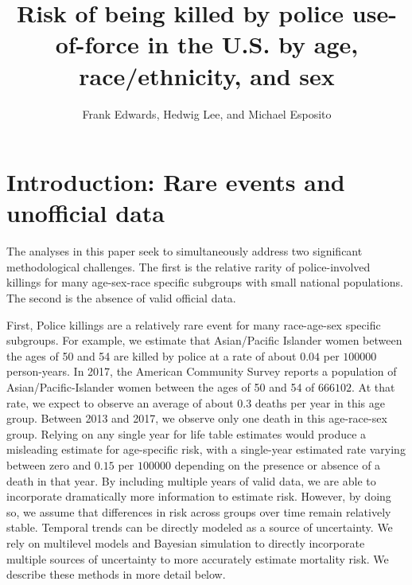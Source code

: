 \documentclass[9pt,twoside,lineno]{pnas-new}
\title{Risk of being killed by police use-of-force in the U.S. by age, race/ethnicity, and sex}
\author{Frank Edwards, Hedwig Lee, and Michael Esposito}
\begin{document}
\maketitle

\SItext

\section*{Introduction: Rare events and unofficial data}

The analyses in this paper seek to simultaneously address two significant methodological challenges. The first is the relative rarity of police-involved killings for many age-sex-race specific subgroups with small national populations. The second is the absence of valid official data. 

First, Police killings are a relatively rare event for many race-age-sex specific subgroups. For example, we estimate that Asian/Pacific Islander women between the ages of 50 and 54 are killed by police at a rate of about $0.04$ per $100000$ person-years. In 2017, the American Community Survey reports a population of Asian/Pacific-Islander women between the ages of 50 and 54 of $666102$. At that rate, we expect to observe an average of about 0.3 deaths per year in this age group. Between 2013 and 2017, we observe only one death in this age-race-sex group. Relying on any single year for life table estimates would produce a misleading estimate for age-specific risk, with a single-year estimated rate varying between zero and $0.15$ per $100000$ depending on the presence or absence of a death in that year. By including multiple years of valid data, we are able to incorporate dramatically more information to estimate risk. However, by doing so, we assume that differences in risk across groups over time remain relatively stable. Temporal trends can be directly modeled as a source of uncertainty. We rely on multilevel models and Bayesian simulation to directly incorporate multiple sources of uncertainty to more accurately estimate mortality risk. We describe these methods in more detail below.
\end{document}
